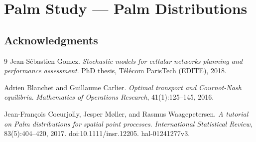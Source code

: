 \documentclass[11pt,a4paper]{article}
\begin{document}
\section{Palm Study --- Palm Distributions}
\begingroup
\let\StudySubsection\subsection
\let\StudySubsubsection\subsubsection
\let\StudyParagraph\paragraph
\renewcommand{\section}{\StudySubsection}
\renewcommand{\subsection}{\StudySubsubsection}
\renewcommand{\subsubsection}{\StudyParagraph}

\endgroup


\section*{Acknowledgments}

\begin{thebibliography}{9}
Jean-Sébastien Gomez.
\textit{Stochastic models for cellular networks planning and performance assessment}.
PhD thesis, Télécom ParisTech (EDITE), 2018.

Adrien Blanchet and Guillaume Carlier.
\textit{Optimal transport and Cournot-Nash equilibria}.
\textit{Mathematics of Operations Research}, 41(1):125--145, 2016.

Jean-Fran\c{c}ois Coeurjolly, Jesper M{\o}ller, and Rasmus Waagepetersen.
\textit{A tutorial on Palm distributions for spatial point processes}.
\textit{International Statistical Review}, 83(5):404--420, 2017.
doi:10.1111/insr.12205. hal-01241277v3.
\end{thebibliography}
\end{document}

